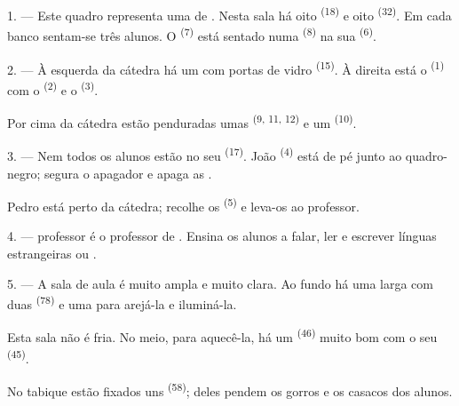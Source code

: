 \VUsaut{1.4mm}
\VUsaut{2.2mm}
\VUfilet{20mm}
\VUsaut{6.4mm}

\VUsaut{3.0mm}

1. --- Este quadro representa uma  de .
Nesta sala há oito  \textsuperscript{(18)} e oito 
\textsuperscript{(32)}. Em cada banco sentam-se três alunos. O
 \textsuperscript{(7)} está sentado numa 
\textsuperscript{(8)} na sua  \textsuperscript{(6)}.

2. --- À esquerda da cátedra há um  com portas de vidro
\textsuperscript{(15)}. À direita está o 
\textsuperscript{(1)} com o  \textsuperscript{(2)} e o 
\textsuperscript{(3)}.

Por cima da cátedra estão penduradas umas 
\textsuperscript{(9, 11, 12)} e um  \textsuperscript{(10)}.

3. --- Nem todos os alunos estão no seu  \textsuperscript{(17)}. João
\textsuperscript{(4)} está de pé junto ao quadro-negro; segura o apagador e
apaga as .

Pedro está perto da cátedra; recolhe os 
\textsuperscript{(5)} e leva-os ao professor.

4. ---  professor é o professor de .
Ensina os alunos a falar, ler e escrever línguas estrangeiras
 ou .

5. --- A sala de aula é muito ampla e muito clara. Ao fundo há uma
 larga com duas  \textsuperscript{(78)} e uma
 para arejá-la e iluminá-la.

Esta sala não é fria. No meio, para aquecê-la, há um 
\textsuperscript{(46)} muito bom com o seu  \textsuperscript{(45)}.

No tabique estão fixados uns  \textsuperscript{(58)}; deles pendem
os gorros e os casacos dos alunos.

\VUsaut{5.2mm}
\VUsaut{3.6mm}

